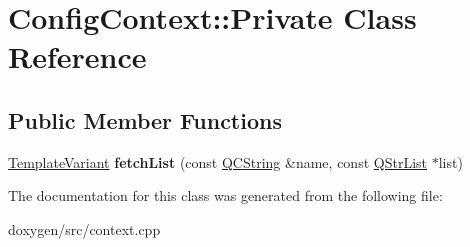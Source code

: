 \hypertarget{class_config_context_1_1_private}{}\section{Config\+Context\+::Private Class Reference}
\label{class_config_context_1_1_private}
\subsection*{Public Member Functions}
\begin{DoxyCompactItemize}
\item 
\mbox{\label{class_config_context_1_1_private_ad816333fe77714e54c666cfe2424825d}} 
\mbox{\hyperlink{class_template_variant}{Template\+Variant}} {\bfseries fetch\+List} (const \mbox{\hyperlink{class_q_c_string}{Q\+C\+String}} \&name, const \mbox{\hyperlink{class_q_str_list}{Q\+Str\+List}} $\ast$list)
\end{DoxyCompactItemize}


The documentation for this class was generated from the following file\+:\begin{DoxyCompactItemize}
\item 
doxygen/src/context.\+cpp\end{DoxyCompactItemize}
